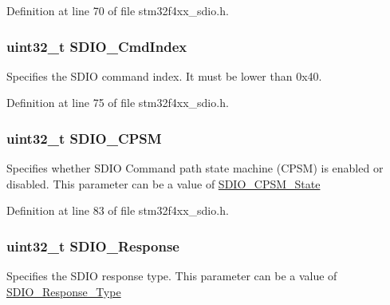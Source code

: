 Definition at line 70 of file stm32f4xx\-\_\-sdio.\-h.

\hypertarget{struct_s_d_i_o___cmd_init_type_def_a8b55bd6b004ba9105f153e0147fbaa25}{
\subsubsection[{S\-D\-I\-O\-\_\-\-Cmd\-Index}]{\setlength{\rightskip}{0pt plus 5cm}uint32\-\_\-t S\-D\-I\-O\-\_\-\-Cmd\-Index}}\label{struct_s_d_i_o___cmd_init_type_def_a8b55bd6b004ba9105f153e0147fbaa25}
Specifies the S\-D\-I\-O command index. It must be lower than 0x40. 

Definition at line 75 of file stm32f4xx\-\_\-sdio.\-h.

\hypertarget{struct_s_d_i_o___cmd_init_type_def_a67da149308b7fcafddd7b3d62513845f}{
\subsubsection[{S\-D\-I\-O\-\_\-\-C\-P\-S\-M}]{\setlength{\rightskip}{0pt plus 5cm}uint32\-\_\-t S\-D\-I\-O\-\_\-\-C\-P\-S\-M}}\label{struct_s_d_i_o___cmd_init_type_def_a67da149308b7fcafddd7b3d62513845f}
Specifies whether S\-D\-I\-O Command path state machine (C\-P\-S\-M) is enabled or disabled. This parameter can be a value of \hyperlink{group___s_d_i_o___c_p_s_m___state}{S\-D\-I\-O\-\_\-\-C\-P\-S\-M\-\_\-\-State} 

Definition at line 83 of file stm32f4xx\-\_\-sdio.\-h.

\hypertarget{struct_s_d_i_o___cmd_init_type_def_aeff6d745f123c5f75fd094a856426aae}{
\subsubsection[{S\-D\-I\-O\-\_\-\-Response}]{\setlength{\rightskip}{0pt plus 5cm}uint32\-\_\-t S\-D\-I\-O\-\_\-\-Response}}\label{struct_s_d_i_o___cmd_init_type_def_aeff6d745f123c5f75fd094a856426aae}
Specifies the S\-D\-I\-O response type. This parameter can be a value of \hyperlink{group___s_d_i_o___response___type}{S\-D\-I\-O\-\_\-\-Response\-\_\-\-Type} 

